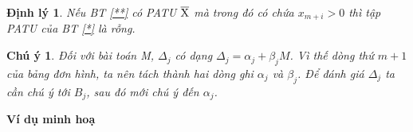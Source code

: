 \documentclass{article}
\newtheorem{dl}{Định lý}
\newtheorem{cy}{Chú ý}
\begin{document}
\begin{enumerate}
\begin{dl}
                                \item Nếu BT \eqref{**} có PATU $\overline{\rm X}$ mà trong đó có chứa $x_{m+i}>0$ thì tập PATU của BT \eqref{*} là rỗng.
                            \end{dl}
                            \begin{cy}
                                Đối với bài toán M, $\Delta_j$ có dạng $\Delta_j=\alpha_j+\beta_jM$. Vì thế dòng thứ $m+1$ của bảng đơn hình, ta nên tách thành hai dòng ghi $\alpha _j$ và $\beta_j$. Để đánh giá $\Delta_j$ ta cần chú ý tới $B_j$, sau đó mới chú ý đến $\alpha_j$.
                            \end{cy} 
                    \item \textbf{Ví dụ minh hoạ} \\          
                \end{enumerate}
\end{document}
